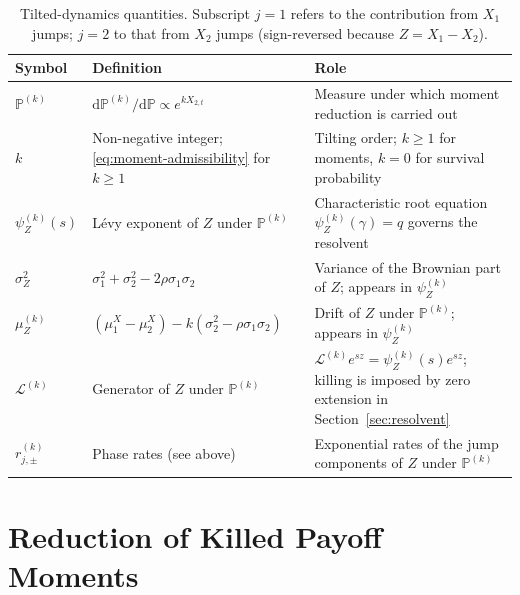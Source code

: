 \documentclass[11pt]{article}
\renewcommand{\P}{\mathbb{P}}
\newcommand{\diff}{\mathrm{d}}
\theoremstyle{plain}
\theoremstyle{definition}
\theoremstyle{remark}
\begin{document}
\begin{table}[ht]
\centering\small
\renewcommand{\arraystretch}{1.35}
\begin{tabularx}{\linewidth}{l l X}
\hline
Symbol & Definition & Role \\
\hline
$\P^{(k)}$ & $\diff\P^{(k)}/\diff\P\propto e^{kX_{2,t}}$ & Measure under which moment reduction is carried out \\
$k$ & Non-negative integer; \eqref{eq:moment-admissibility} for $k\ge1$ & Tilting order; $k\ge 1$ for moments, $k=0$ for survival probability \\
$\psi_Z^{(k)}(s)$ & L\'evy exponent of $Z$ under $\P^{(k)}$ & Characteristic root equation $\psi_Z^{(k)}(\gamma)=q$ governs the resolvent \\
$\sigma_Z^2$ & $\sigma_1^2+\sigma_2^2-2\rho\sigma_1\sigma_2$ & Variance of the Brownian part of $Z$; appears in $\psi_Z^{(k)}$ \\
$\mu_Z^{(k)}$ & $(\mu_1^X-\mu_2^X)-k(\sigma_2^2-\rho\sigma_1\sigma_2)$ & Drift of $Z$ under $\P^{(k)}$; appears in $\psi_Z^{(k)}$ \\
$\mathcal{L}^{(k)}$ & Generator of $Z$ under $\P^{(k)}$ & $\mathcal{L}^{(k)}e^{sz}=\psi_Z^{(k)}(s)e^{sz}$; killing is imposed by zero extension in Section~\ref{sec:resolvent} \\
$r_{j,\pm}^{(k)}$ & Phase rates (see above) & Exponential rates of the jump components of $Z$ under $\P^{(k)}$ \\
\hline
\end{tabularx}
\caption{Tilted-dynamics quantities. Subscript $j=1$ refers to the contribution from $X_1$ jumps;
$j=2$ to that from $X_2$ jumps (sign-reversed because $Z=X_1-X_2$).}
\label{tab:tilted-params}
\end{table}

\section{Reduction of Killed Payoff Moments}\label{sec:moments}
\end{document}
